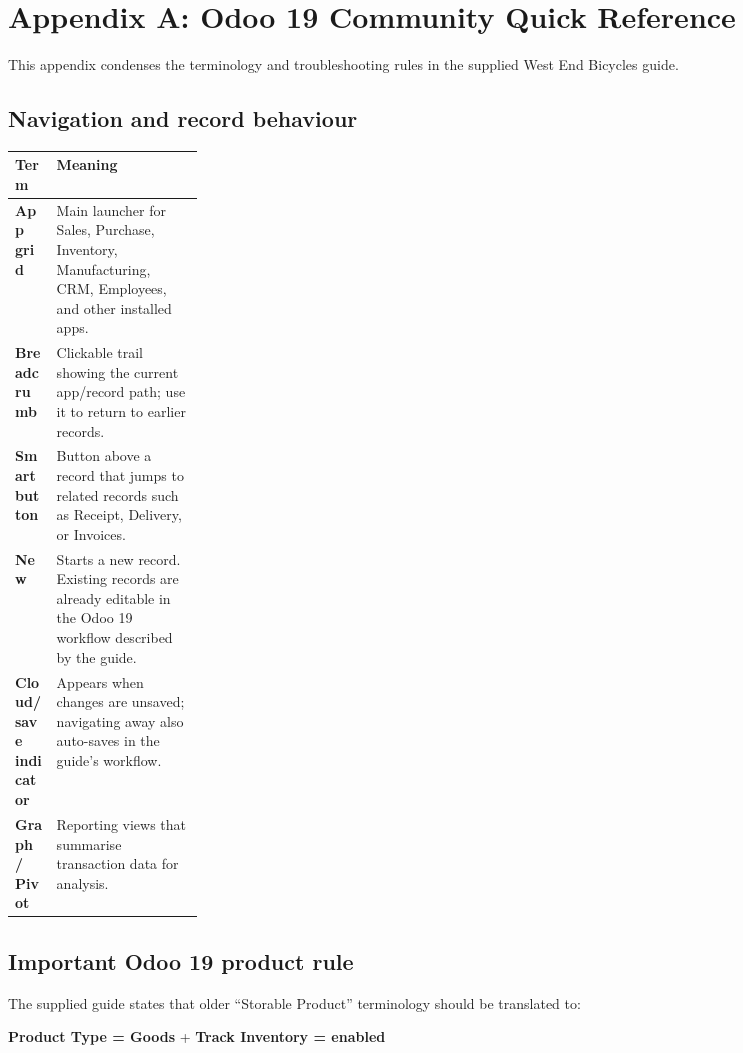\chapter*{Appendix A: Odoo 19 Community Quick Reference}

This appendix condenses the terminology and troubleshooting rules in the supplied West End Bicycles guide.

\section*{Navigation and record behaviour}

\begin{erptable}
\begin{tabularx}{\linewidth}{@{}>{\bfseries\color{ERPNavy}}p{0.22\linewidth}X@{}}
\toprule
\rowcolor{ERPPaleBlue!92}
Term & Meaning \\
\midrule
App grid & Main launcher for Sales, Purchase, Inventory, Manufacturing, CRM, Employees, and other installed apps. \\
Breadcrumb & Clickable trail showing the current app/record path; use it to return to earlier records. \\
Smart button & Button above a record that jumps to related records such as Receipt, Delivery, or Invoices. \\
New & Starts a new record. Existing records are already editable in the Odoo 19 workflow described by the guide. \\
Cloud/save indicator & Appears when changes are unsaved; navigating away also auto-saves in the guide's workflow. \\
Graph / Pivot & Reporting views that summarise transaction data for analysis. \\
\bottomrule
\end{tabularx}
\end{erptable}

\section*{Important Odoo 19 product rule}

The supplied guide states that older ``Storable Product'' terminology should be translated to:

\begin{center}
\textbf{Product Type = Goods} \qquad + \qquad \textbf{Track Inventory = enabled}
\end{center}

